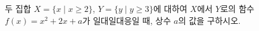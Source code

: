 두 집합 $X=\{x \mid x\ge 2\}$, $Y=\{y \mid y\ge 3\}$에 대하여 $X$에서 $Y$로의 함수 $f(x)=x^2+2x+a$가 일대일대응일 때, 상수 $a$의 값을 구하시오.
